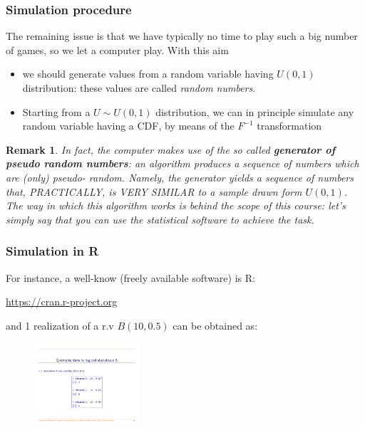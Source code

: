 \documentclass[notes=show,smaller,handout]{beamer}\usepackage[]{graphicx}\usepackage[]{color}
\newtheorem{remark}{Remark}[section]
\begin{document}
\begin{frame}
\frametitle{Simulation procedure}

The remaining issue is that we have typically no
time to play such a big number of games, so we let a computer play.
With this aim

\begin{itemize}
\item we should generate values from a random  variable
having $U(0,1)$ distribution: these values are called \textit{random numbers}.

\item Starting from a $U \sim U(0,1)$ distribution, we can in principle simulate any random variable having a CDF, by means of the $F^{-1}$ transformation %

\end{itemize}

\begin{remark}
In fact, the computer makes use of the so called \textbf{generator of pseudo random numbers}: an algorithm produces a sequence of numbers which are (only) pseudo-
random. Namely, the generator yields a sequence of numbers that, PRACTICALLY, is VERY SIMILAR to a sample drawn form $U(0,1)$. The way in which this algorithm works is behind the scope of this course: let's simply say that you can use the statistical software to achieve the task.
\end{remark}



\end{frame}



\begin{frame}
\frametitle{Simulation in R}

For instance, a well-know (freely available software) is R:

\begin{center}
\url{https://cran.r-project.org}
\end{center}


\medskip

and 1 realization of a r.v  $B(10, 0.5)$ can be obtained as:

\medskip

\begin{center} %
\begin{figure}[ptb]\centering
\includegraphics[width=0.35\textwidth,height=0.35\textheight]{img/sim1.pdf}
\end{figure}

\end{center}
\end{frame}
\end{document}
